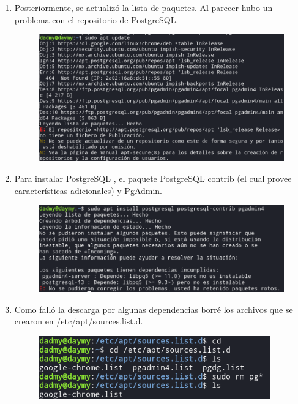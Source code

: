 \documentclass{exam}
\begin{document}
\begin{enumerate}
\item Posteriormente, se actualizó la lista de paquetes. Al parecer hubo un problema con el repositorio de PostgreSQL.
\begin{figure}[h]
	\centering
    \includegraphics[width = 15cm]{imgNolasco/6.png}
\end{figure}


\newpage
\item Para instalar PostgreSQL , el paquete PostgreSQL contrib (el cual provee características adicionales) y PgAdmin.
\begin{figure}[h]
	\centering
    \includegraphics[width = 15cm]{imgNolasco/7.png}
\end{figure}


\item Como falló la descarga por algunas dependencias borré los archivos que se crearon en /etc/apt/sources.list.d.
\begin{figure}[h]
	\centering
    \includegraphics[width = 10cm]{imgNolasco/8.png}
\end{figure}



\end{enumerate}
\end{document}
